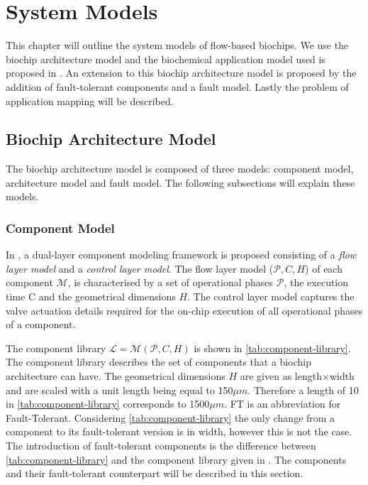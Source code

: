 \chapter{System Models}
\label{chap:sys}
This chapter will outline the system models of flow-based biochips. We use the biochip architecture model and the biochemical application model used is proposed in \cite{wajid}. An extension to this biochip architecture model is proposed by the addition of fault-tolerant components and a fault model. Lastly the problem of application mapping will be described.

\section{Biochip Architecture Model}
The biochip architecture model is composed of three models: component model, architecture model and fault model. The following subsections will explain these models.

\subsection{Component Model}
In \cite{wajid}, a dual-layer component modeling framework is proposed consisting of a \emph{flow layer model} and a \emph{control layer model}. The flow layer model ($\mathcal{P}, C, H$) of each component $\mathcal{M}$, is characterised by a set of operational phases $\mathcal{P}$, the execution time C and the geometrical dimensions $H$. The control layer model captures the valve actuation details required for the on-chip execution of all operational phases of a component. 

The component library $\mathcal{L} = \mathcal{M}(\mathcal{P}, C, H)$ is shown in \autoref{tab:component-library}. The component library describes the set of components that a biochip architecture can have. The geometrical dimensions $H$ are given as length$\times$width and are scaled with a unit length being equal to 150$\mu m$. Therefore a length of 10 in \autoref{tab:component-library} corresponds to 1500$\mu m$. FT is an abbreviation for Fault-Tolerant. Considering \autoref{tab:component-library} the only change from a component to its fault-tolerant version is in width, however this is not the case. The introduction of fault-tolerant components is the difference between \autoref{tab:component-library} and the component library given in \cite{wajid}. The components and their fault-tolerant counterpart will be described in this section.


